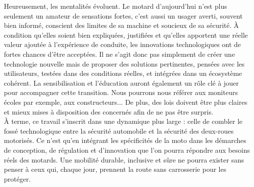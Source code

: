 Heureusement, les mentalités évoluent. Le motard d’aujourd’hui n’est plus seulement un amateur de sensations fortes, c’est aussi un usager averti, souvent bien informé, conscient des limites de sa machine et soucieux de sa sécurité. À condition qu’elles soient bien expliquées, justifiées et qu’elles apportent une réelle valeur ajoutée à l’expérience de conduite, les innovations technologiques ont de fortes chances d’être acceptées.
Il ne s’agit donc pas simplement de créer une technologie nouvelle mais de proposer des solutions pertinentes, pensées avec les utilisateurs, testées dans des conditions réelles, et intégrées dans un écosystème cohérent. La sensibilisation et l’éducation auront également un rôle clé à jouer pour accompagner cette transition. Nous pourrons nous référer aux moniteurs écoles par exemple, aux constructeurs...
De plus, des lois doivent être plus claires et mieux mises à disposition des concernés afin de ne pas être surpris.\\
À terme, ce travail s’inscrit dans une dynamique plus large : celle de combler le fossé technologique entre la sécurité automobile et la sécurité des deux-roues motorisés. Ce n’est qu’en intégrant les spécificités de la moto dans les démarches de conception, de régulation et d’innovation que l’on pourra répondre aux besoins réels des motards. Une mobilité durable, inclusive et sûre ne pourra exister sans penser à ceux qui, chaque jour, prennent la route sans carrosserie pour les protéger.
